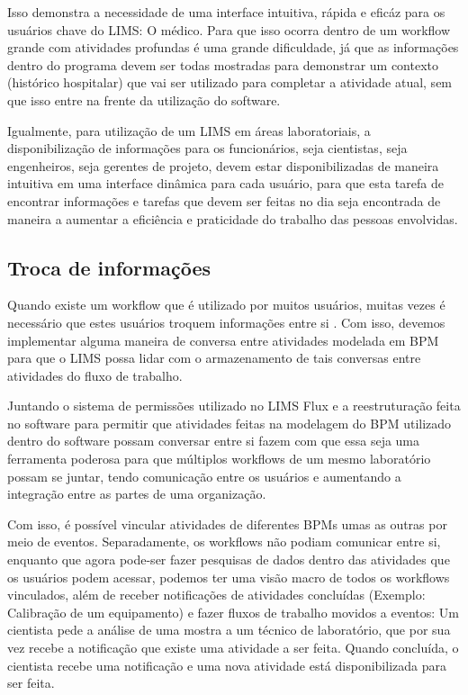 Isso demonstra a necessidade de uma interface intuitiva, rápida e eficáz para os usuários chave do LIMS: O médico. Para que isso ocorra dentro de um workflow grande com atividades profundas é uma grande dificuldade, já que as informações dentro do programa devem ser todas mostradas para demonstrar um contexto (histórico hospitalar) que vai ser utilizado para completar a atividade atual, sem que isso entre na frente da utilização do software.


Igualmente, para utilização de um LIMS em áreas laboratoriais, a disponibilização de informações para os funcionários, seja cientistas, seja engenheiros, seja gerentes de projeto, devem estar disponibilizadas de maneira intuitiva em uma interface dinâmica para cada usuário, para que esta tarefa de encontrar informações e tarefas que devem ser feitas no dia seja encontrada de maneira a aumentar a eficiência e praticidade do trabalho das pessoas envolvidas.

\subsection{Troca de informações}


Quando existe um workflow que é utilizado por muitos usuários, muitas vezes é necessário que estes usuários troquem informações entre si \R. Com isso, devemos implementar alguma maneira de conversa entre atividades modelada em BPM para que o LIMS possa lidar com o armazenamento de tais conversas entre atividades do fluxo de trabalho.


Juntando o sistema de permissões utilizado no LIMS Flux \R e a reestruturação feita no software para permitir que atividades feitas na modelagem do BPM utilizado dentro do software possam conversar entre si fazem com que essa seja uma ferramenta poderosa para que múltiplos workflows de um mesmo laboratório possam se juntar, tendo comunicação entre os usuários e aumentando a integração entre as partes de uma organização.


Com isso, é possível vincular atividades de diferentes BPMs umas as outras por meio de eventos. Separadamente, os workflows não podiam comunicar entre si, enquanto que agora pode-ser fazer pesquisas de dados dentro das atividades que os usuários podem acessar, podemos ter uma visão macro de todos os workflows vinculados, além de receber notificações de atividades concluídas (Exemplo: Calibração de um equipamento) e fazer fluxos de trabalho movidos a eventos: Um cientista pede a análise de uma mostra a um técnico de laboratório, que por sua vez recebe a notificação que existe uma atividade a ser feita. Quando concluída, o cientista recebe uma notificação e uma nova atividade está disponibilizada para ser feita.

